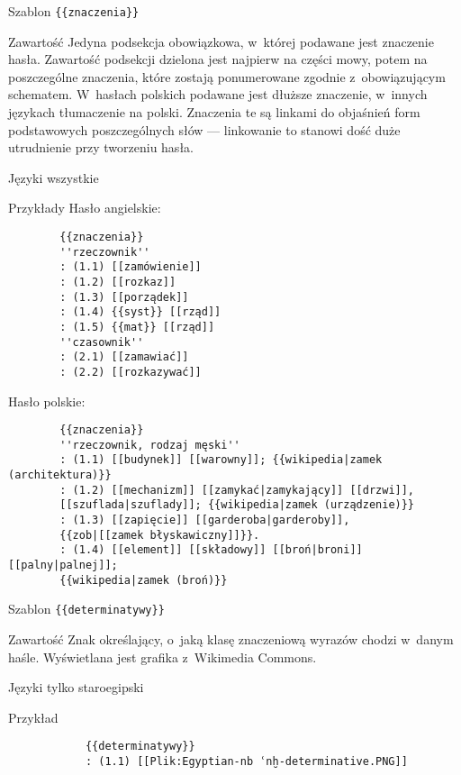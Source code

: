 \begin{opis}
	\item[Szablon] \verb|{{znaczenia}}|
	\item[Zawartość] Jedyna podsekcja obowiązkowa, w~której podawane jest znaczenie hasła. Zawartość podsekcji dzielona jest najpierw na części mowy, potem na poszczególne znaczenia, które zostają ponumerowane zgodnie z~obowiązującym schematem. W~hasłach polskich podawane jest dłuższe znaczenie, w~innych językach tłumaczenie na polski. Znaczenia te są linkami do objaśnień form podstawowych poszczególnych słów --- linkowanie to stanowi dość duże utrudnienie przy tworzeniu hasła.
	\item[Języki] wszystkie
	\item[Przykłady] Hasło angielskie:
		\begin{verbatim}
		{{znaczenia}}
		''rzeczownik''
		: (1.1) [[zamówienie]]
		: (1.2) [[rozkaz]]
		: (1.3) [[porządek]]
		: (1.4) {{syst}} [[rząd]]
		: (1.5) {{mat}} [[rząd]]
		''czasownik''
		: (2.1) [[zamawiać]]
		: (2.2) [[rozkazywać]]
		\end{verbatim}
		Hasło polskie:
		\begin{verbatim}
		{{znaczenia}}
		''rzeczownik, rodzaj męski''
		: (1.1) [[budynek]] [[warowny]]; {{wikipedia|zamek (architektura)}}
		: (1.2) [[mechanizm]] [[zamykać|zamykający]] [[drzwi]],
		[[szuflada|szuflady]]; {{wikipedia|zamek (urządzenie)}}
		: (1.3) [[zapięcie]] [[garderoba|garderoby]],
		{{zob|[[zamek błyskawiczny]]}}.
		: (1.4) [[element]] [[składowy]] [[broń|broni]] [[palny|palnej]];
		{{wikipedia|zamek (broń)}}
		\end{verbatim}
\end{opis}
\spacer
\begin{opis}
	\item[Szablon] \verb|{{determinatywy}}|
	\item[Zawartość] Znak określający, o~jaką klasę znaczeniową wyrazów chodzi w~danym haśle. Wyświetlana jest grafika z~Wikimedia Commons.
	\item[Języki] tylko staroegipski
	\item[Przykład]
		\begin{verbatim}
			{{determinatywy}}
			: (1.1) [[Plik:Egyptian-nb ʿnḫ-determinative.PNG]]
		\end{verbatim}
\end{opis}
\spacer

